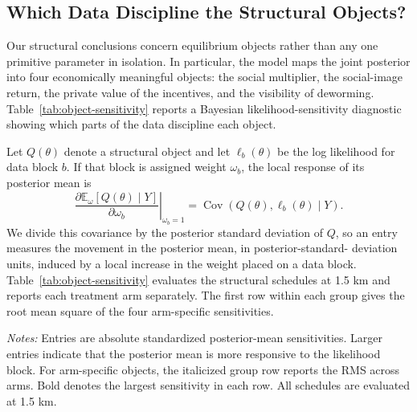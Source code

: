 \documentclass[12pt]{article}
\begin{document}
\providecommand{\StructuralRobustnessPath}{appendix/structural-robustness}
\providecommand{\E}{\mathbb{E}}
\providecommand{\Cov}{\operatorname{Cov}}

\subsection{Which Data Discipline the Structural Objects?}
\label{app:structural-object-sensitivity}

Our structural conclusions concern equilibrium objects rather than any one
primitive parameter in isolation. In particular, the model maps the joint
posterior into four economically meaningful objects: the social multiplier,
the social-image return, the private value of the incentives, and the
visibility of deworming. Table~\ref{tab:object-sensitivity} reports a Bayesian
likelihood-sensitivity diagnostic showing which parts of the data discipline
each object.

Let $Q(\theta)$ denote a structural object and let $\ell_b(\theta)$ be the log
likelihood for data block $b$. If that block is assigned weight $\omega_b$,
the local response of its posterior mean is
\[
  \left.
  \frac{\partial \E_{\omega}[Q(\theta)\mid Y]}
       {\partial \omega_b}
  \right|_{\omega_b=1}
  =
  \Cov\!\left(Q(\theta),\ell_b(\theta)\mid Y\right).
\]
We divide this covariance by the posterior standard deviation of $Q$, so an
entry measures the movement in the posterior mean, in posterior-standard-
deviation units, induced by a local increase in the weight placed on a data
block. Table~\ref{tab:object-sensitivity} evaluates the structural schedules
at 1.5 km and reports each treatment arm separately. The first row within each
group gives the root mean square of the four arm-specific sensitivities.

\begin{table}[htbp]
  \centering
  \small
  \caption{Absolute posterior-mean sensitivity of structural objects to the data}
  \label{tab:object-sensitivity}
  
  \begin{minipage}{0.90\linewidth}
    \vspace{0.4em}\footnotesize
    \textit{Notes:} Entries are absolute standardized posterior-mean
    sensitivities. Larger entries indicate that the posterior mean is more
    responsive to the likelihood block. For arm-specific objects, the
    italicized group row reports the RMS across arms. Bold denotes the largest
    sensitivity in each row. All schedules are evaluated at 1.5 km.
  \end{minipage}
\end{table}
\end{document}
